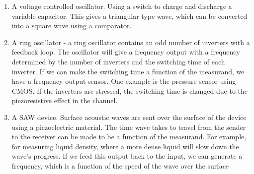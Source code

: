 \documentclass[10pt,a4paper]{article}
\begin{document}
\begin{enumerate}

	\item A voltage controlled oscillator. Using a switch to charge and discharge a variable capacitor. This gives a triangular type wave, which can be converted into a square wave using a comparator.
	\item A ring oscillator - a ring oscillator contains an odd number of inverters with a feedback loop. The oscillator will give a frequency output with a frequency determined by the number of inverters and the switching time of each inverter. If we can make the switching time a function of the measurand, we have a frequency output sensor. One example is the pressure sensor using CMOS. If the inverters are stressed, the switching time is changed due to the piezoresistive effect in the channel.
	\item A SAW device. Surface acoustic waves are sent over the surface of the device using a piezoelectric material. The time wave takes to travel from the sender to the receiver can be made to be a function of the measurand. For example, for measuring liquid density, where a more dense liquid will slow down the wave's progress. If we feed this output back to the input, we can generate a frequency, which is a function of the speed of the wave over the surface
\end{enumerate}
\end{document}
